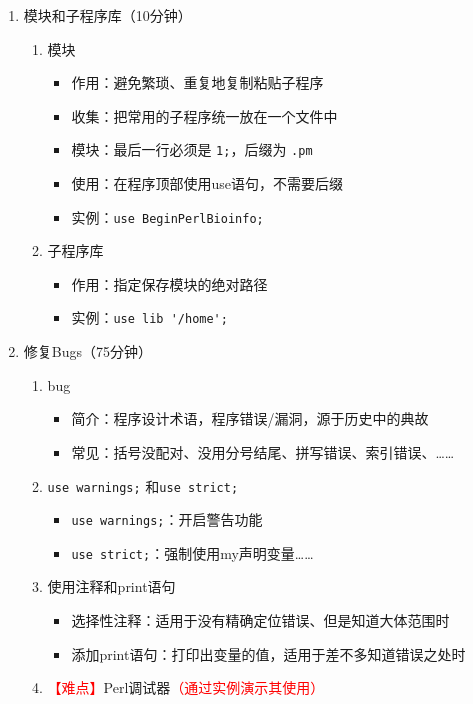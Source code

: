 \documentclass{TIJMUjiaoanLL}
\begin{document}
\begin{enumerate}
  \item 模块和子程序库（10分钟）
    \begin{enumerate}
      \item 模块
        \begin{itemize}
           \item 作用：避免繁琐、重复地复制粘贴子程序
           \item 收集：把常用的子程序统一放在一个文件中
	   \item 模块：最后一行必须是 \verb|1;|，后缀为 \verb|.pm|
	   \item 使用：在程序顶部使用use语句，不需要后缀
	   \item 实例：\verb|use BeginPerlBioinfo;|
        \end{itemize}
      \item 子程序库
	\begin{itemize}
	  \item 作用：指定保存模块的绝对路径
	  \item 实例：\verb|use lib '/home';|
	\end{itemize}
    \end{enumerate}
  \item 修复Bugs（75分钟）
    \begin{enumerate}
      \item bug
	\begin{itemize}
	  \item 简介：程序设计术语，程序错误/漏洞，源于历史中的典故
	  \item 常见：括号没配对、没用分号结尾、拼写错误、索引错误、……
	\end{itemize}
      \item \verb|use warnings;| 和\verb|use strict;|
	\begin{itemize}
	  \item \verb|use warnings;|：开启警告功能
	  \item \verb|use strict;|：强制使用my声明变量……
	\end{itemize}
      \item 使用注释和print语句
	\begin{itemize}
	  \item 选择性注释：适用于没有精确定位错误、但是知道大体范围时
	  \item 添加print语句：打印出变量的值，适用于差不多知道错误之处时
	\end{itemize}
      \item \textcolor{red}{【难点】}Perl调试器\textcolor{red}{（通过实例演示其使用）}
	\begin{itemize}

\end{itemize}
\end{enumerate}
\end{enumerate}
\end{document}
